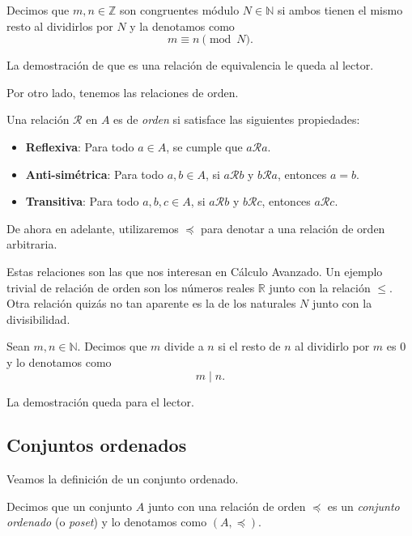 \begin{example}
    Decimos que $m, n \in \mathbb{Z}$ son congruentes módulo $N \in \mathbb{N}$ si ambos tienen el mismo resto al dividirlos por $N$ y la denotamos como
    $$
        m \equiv n \pmod{N}.
    $$
\end{example}

La demostración de que es una relación de equivalencia le queda al lector.

Por otro lado, tenemos las relaciones de orden.

\begin{definition}
    Una relación $\mathcal{R}$ en $A$ es de \emph{orden} si satisface las siguientes propiedades:
    \begin{itemize}
        \item \textbf{Reflexiva}: Para todo $a \in A$, se cumple que $a \mathcal{R} a$.
        \item \textbf{Anti-simétrica}: Para todo $a, b \in A$, si $a \mathcal{R} b$ y $b \mathcal{R} a$, entonces $a = b$.
        \item \textbf{Transitiva}: Para todo $a, b, c \in A$, si $a \mathcal{R} b$ y $b \mathcal{R} c$, entonces $a \mathcal{R} c$.
    \end{itemize}
\end{definition}

De ahora en adelante, utilizaremos $\preceq$ para denotar a una relación de orden arbitraria.

Estas relaciones son las que nos interesan en Cálculo Avanzado. Un ejemplo trivial de relación de orden son los números reales $\mathbb{R}$ junto con la relación $ \leq $. Otra relación quizás no tan aparente es la de los naturales $N$ junto con la divisibilidad.

\begin{example}
    Sean $m, n \in \mathbb{N}$. Decimos que $m$ divide a $n$ si el resto de $n$ al dividirlo por $m$ es $0$ y lo denotamos como
    $$
        m \mid n.
    $$
\end{example}

La demostración queda para el lector.

\subsection{Conjuntos ordenados}

Veamos la definición de un conjunto ordenado.

\begin{definition}
    Decimos que un conjunto $A$ junto con una relación de orden $\preceq$ es un \emph{conjunto ordenado} (o \emph{poset}) y lo denotamos como $(A, \preceq)$.
\end{definition}

